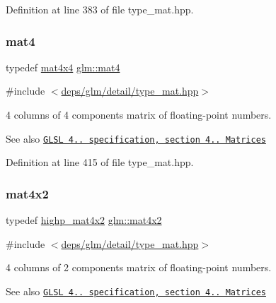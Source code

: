 Definition at line 383 of file type\+\_\+mat.\+hpp.

\mbox{\label{group__core__types_ga7dcd2365c2e368e6af5b7adeb6a9c8df}} 
\subsubsection{\texorpdfstring{mat4}{mat4}}
{\footnotesize\ttfamily typedef \hyperlink{group__core__types_ga63e3ee9447ed593484140a9368e738ec}{mat4x4} \hyperlink{group__core__types_ga7dcd2365c2e368e6af5b7adeb6a9c8df}{glm\+::mat4}}



{\ttfamily \#include $<$\hyperlink{type__mat_8hpp}{deps/glm/detail/type\+\_\+mat.\+hpp}$>$}

4 columns of 4 components matrix of floating-\/point numbers.

\begin{DoxySeeAlso}{See also}
\href{http://www.opengl.org/registry/doc/GLSLangSpec.4.20.8.pdf}{\tt G\+L\+SL 4.. specification, section 4.. Matrices} 
\end{DoxySeeAlso}


Definition at line 415 of file type\+\_\+mat.\+hpp.

\mbox{\label{group__core__types_ga72cf8ec4f4cda85943f4683531e421bc}} 
\subsubsection{\texorpdfstring{mat4x2}{mat4x2}}
{\footnotesize\ttfamily typedef \hyperlink{group__core__precision_ga0355949c79024224f7e9cfa06bc82153}{highp\+\_\+mat4x2} \hyperlink{group__core__types_ga72cf8ec4f4cda85943f4683531e421bc}{glm\+::mat4x2}}



{\ttfamily \#include $<$\hyperlink{type__mat_8hpp}{deps/glm/detail/type\+\_\+mat.\+hpp}$>$}

4 columns of 2 components matrix of floating-\/point numbers.

\begin{DoxySeeAlso}{See also}
\href{http://www.opengl.org/registry/doc/GLSLangSpec.4.20.8.pdf}{\tt G\+L\+SL 4.. specification, section 4.. Matrices} 
\end{DoxySeeAlso}


